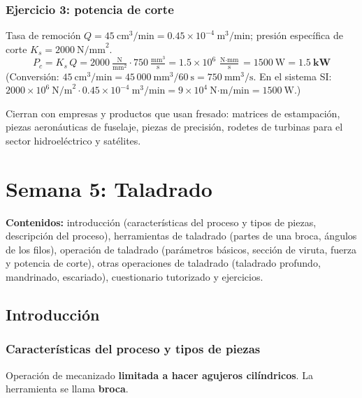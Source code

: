 \documentclass[12pt,a4paper]{article}
\begin{document}
\subsubsection*{Ejercicio 3: potencia de corte}
Tasa de remoción $Q = 45\ \text{cm}^3/\text{min} = 0.45\times 10^{-4}\
	\text{m}^3/\text{min}$; presión específica de corte $K_s = 2000\
	\text{N/mm}^2$.
\[ P_c = K_s\, Q = 2000\ \tfrac{\text{N}}{\text{mm}^2}\cdot 750\
	\tfrac{\text{mm}^3}{\text{s}} = 1.5\times 10^{6}\
	\tfrac{\text{N}\cdot\text{mm}}{\text{s}} = 1500\ \text{W} = \mathbf{1.5\ kW} \]
(Conversión: $45\ \text{cm}^3/\text{min} = 45\,000\ \text{mm}^3/60\ \text{s} =
	750\ \text{mm}^3/\text{s}$. En el sistema SI: $2000\times10^6\ \text{N/m}^2
	\cdot 0.45\times10^{-4}\ \text{m}^3/\text{min} = 9\times10^4\ \text{N·m/min} =
	1500\ \text{W}$.)

Cierran con empresas y productos que usan fresado: matrices de
estampación, piezas aeronáuticas de fuselaje, piezas de precisión, rodetes de
turbinas para el sector hidroeléctrico y satélites.

\newpage
\section{Semana 5: Taladrado}

\textbf{Contenidos:} introducción (características del proceso y tipos de
piezas, descripción del proceso), herramientas de taladrado (partes de una
broca, ángulos de los filos), operación de taladrado (parámetros básicos,
sección de viruta, fuerza y potencia de corte), otras operaciones de taladrado
(taladrado profundo, mandrinado, escariado), cuestionario tutorizado y
ejercicios.

\subsection{Introducción}

\subsubsection{Características del proceso y tipos de piezas}
\begin{defi}[Taladrado]
	Operación de mecanizado \textbf{limitada a hacer agujeros cilíndricos}. La
	herramienta se llama \textbf{broca}.
\end{defi}
\end{document}

